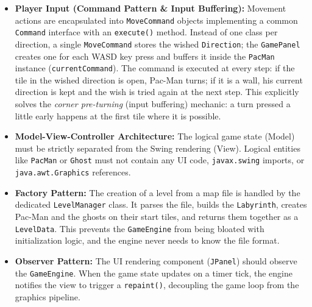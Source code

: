 \documentclass[11pt, a4paper]{article}
\begin{document}
\begin{itemize}
    \item \textbf{Player Input (Command Pattern \& Input Buffering):} Movement actions are encapsulated into \texttt{MoveCommand} objects implementing a common \texttt{Command} interface with an \texttt{execute()} method. Instead of one class per direction, a single \texttt{MoveCommand} stores the wished \texttt{Direction}; the \texttt{GamePanel} creates one for each WASD key press and buffers it inside the \texttt{PacMan} instance (\texttt{currentCommand}). The command is executed at every step: if the tile in the wished direction is open, Pac-Man turns; if it is a wall, his current direction is kept and the wish is tried again at the next step. This explicitly solves the \textit{corner pre-turning} (input buffering) mechanic: a turn pressed a little early happens at the first tile where it is possible.
    \item \textbf{Model-View-Controller Architecture:} The logical game state (Model) must be strictly separated from the Swing rendering (View). Logical entities like \texttt{PacMan} or \texttt{Ghost} must not contain any UI code, \texttt{javax.swing} imports, or \texttt{java.awt.Graphics} references.
    \item \textbf{Factory Pattern:} The creation of a level from a map file is handled by the dedicated \texttt{LevelManager} class. It parses the file, builds the \texttt{Labyrinth}, creates Pac-Man and the ghosts on their start tiles, and returns them together as a \texttt{LevelData}. This prevents the \texttt{GameEngine} from being bloated with initialization logic, and the engine never needs to know the file format.
    \item \textbf{Observer Pattern:} The UI rendering component (\texttt{JPanel}) should observe the \texttt{GameEngine}. When the game state updates on a timer tick, the engine notifies the view to trigger a \texttt{repaint()}, decoupling the game loop from the graphics pipeline.
\end{itemize}
\end{document}
